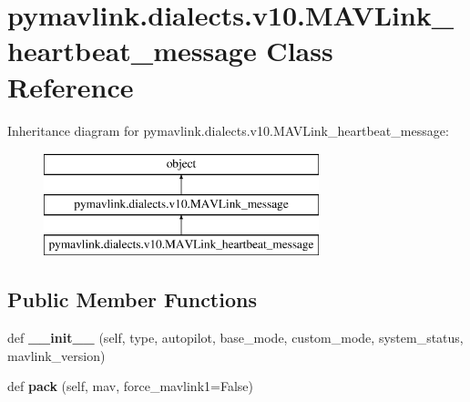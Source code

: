 \hypertarget{classpymavlink_1_1dialects_1_1v10_1_1MAVLink__heartbeat__message}{}\section{pymavlink.\+dialects.\+v10.\+M\+A\+V\+Link\+\_\+heartbeat\+\_\+message Class Reference}
\label{classpymavlink_1_1dialects_1_1v10_1_1MAVLink__heartbeat__message}
Inheritance diagram for pymavlink.\+dialects.\+v10.\+M\+A\+V\+Link\+\_\+heartbeat\+\_\+message\+:\begin{figure}[H]
\begin{center}
\leavevmode
\includegraphics[height=3.000000cm]{classpymavlink_1_1dialects_1_1v10_1_1MAVLink__heartbeat__message}
\end{center}
\end{figure}
\subsection*{Public Member Functions}
\begin{DoxyCompactItemize}
\item 
\mbox{\label{classpymavlink_1_1dialects_1_1v10_1_1MAVLink__heartbeat__message_a0a8331e114da9d171bc999115524d4e5}} 
def {\bfseries \+\_\+\+\_\+init\+\_\+\+\_\+} (self, type, autopilot, base\+\_\+mode, custom\+\_\+mode, system\+\_\+status, mavlink\+\_\+version)
\item 
\mbox{\label{classpymavlink_1_1dialects_1_1v10_1_1MAVLink__heartbeat__message_ad0ed47f3452265c88ae4814ca8eb8aec}} 
def {\bfseries pack} (self, mav, force\+\_\+mavlink1=False)
\end{DoxyCompactItemize}
